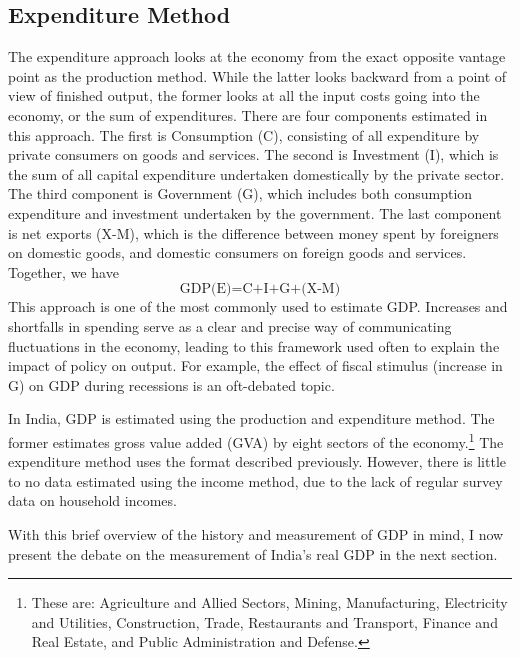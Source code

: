 \documentclass[12pt,nobind, a4paper]{reedthesis}
\begin{document}
 \hypertarget{expenditure-method}{%
 \subsection{Expenditure Method}\label{expenditure-method}}

 The expenditure approach looks at the economy from the exact opposite vantage point as the production method. While the latter looks backward from a point of view of finished output, the former looks at all the input costs going into the economy, or the sum of expenditures. There are four components estimated in this approach. The first is Consumption (C), consisting of all expenditure by private consumers on goods and services. The second is Investment (I), which is the sum of all capital expenditure undertaken domestically by the private sector. The third component is Government (G), which includes both consumption expenditure and investment undertaken by the government. The last component is net exports (X-M), which is the difference between money spent by foreigners on domestic goods, and domestic consumers on foreign goods and services. Together, we have
 \begin{equation}
 \text{GDP(E)}=\text{C+I+G+(X-M)}
 \end{equation}
 This approach is one of the most commonly used to estimate GDP. Increases and shortfalls in spending serve as a clear and precise way of communicating fluctuations in the economy, leading to this framework used often to explain the impact of policy on output. For example, the effect of fiscal stimulus (increase in G) on GDP during recessions is an oft-debated topic.
 \linebreak

 In India, GDP is estimated using the production and expenditure method. The former estimates gross value added (GVA) by eight sectors of the economy.\footnote{These are: Agriculture and Allied Sectors, Mining, Manufacturing, Electricity and Utilities, Construction, Trade, Restaurants and Transport, Finance and Real Estate, and Public Administration and Defense.} The expenditure method uses the format described previously. However, there is little to no data estimated using the income method, due to the lack of regular survey data on household incomes.
 \linebreak

 With this brief overview of the history and measurement of GDP in mind, I now present the debate on the measurement of India's real GDP in the next section.
\end{document}
